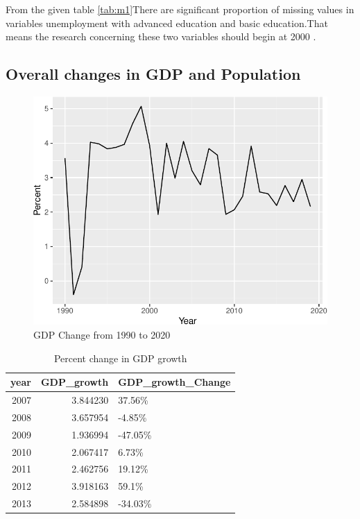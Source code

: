 \documentclass[11pt,a4paper,]{article}
\begin{document}
From the given table \ref{tab:m1}There are significant proportion of missing values in variables unemployment with advanced education and basic education.That means the research concerning these two variables should begin at 2000 .

\subsection{Overall changes in GDP and Population}

\begin{figure}[H]

{\centering \includegraphics{Figures/g1-1} 

}

\caption{GDP Change from 1990 to 2020}\label{fig:g1}
\end{figure}

\begin{table}[H]

\caption{\label{tab:Ichange}Percent change in GDP growth}
\centering
\begin{tabular}[t]{r|r|l}
\hline
year & GDP\_growth & GDP\_growth\_Change\\
\hline
2007 & 3.844230 & 37.56\%\\
\hline
2008 & 3.657954 & -4.85\%\\
\hline
2009 & 1.936994 & -47.05\%\\
\hline
2010 & 2.067417 & 6.73\%\\
\hline
2011 & 2.462756 & 19.12\%\\
\hline
2012 & 3.918163 & 59.1\%\\
\hline
2013 & 2.584898 & -34.03\%\\
\hline
\end{tabular}
\end{table}
\end{document}
